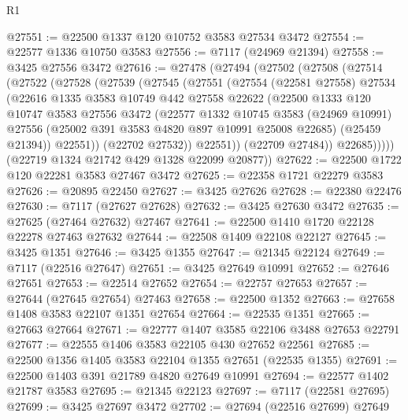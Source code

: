 \begin{lexlean}{R1}
\begin{coremodule}
@27551 := @22500 @1337 @120 @10752 @3583 @27534 @3472
@27554 := @22577 @1336 @10750 @3583
@27556 := @7117 (@24969 @21394)
@27558 := @3425 @27556 @3472
@27616 := @27478
    (@27494
      (@27502
        (@27508
          (@27514
            (@27522
              (@27528
                (@27539
                  (@27545
                    (@27551
                      (@27554
                        (@22581 @27558)
                        @27534
                        (@22616
                          @1335
                          @3583
                          @10749
                          @442
                          @27558
                          @22622
                          (@22500
                            @1333
                            @120
                            @10747
                            @3583
                            @27556
                            @3472
                            (@22577
                              @1332
                              @10745
                              @3583
                              (@24969 @10991)
                              @27556
                              (@25002 @391 @3583 @4820 @897 @10991 @25008 @22685)
                              (@25459 @21394))
                            @22551))
                        (@22702 @27532))
                      @22551))
                  (@22709 @27484))
                @22685)))))
      (@22719 @1324 @21742 @429 @1328 @22099 @20877))
@27622 := @22500 @1722 @120 @22281 @3583 @27467 @3472
@27625 := @22358 @1721 @22279 @3583
@27626 := @20895 @22450
@27627 := @3425 @27626
@27628 := @22380 @22476
@27630 := @7117 (@27627 @27628)
@27632 := @3425 @27630 @3472
@27635 := @27625 (@27464 @27632) @27467
@27641 := @22500 @1410 @1720 @22128 @22278 @27463 @27632
@27644 := @22508 @1409 @22108 @22127
@27645 := @3425 @1351
@27646 := @3425 @1355
@27647 := @21345 @22124
@27649 := @7117 (@22516 @27647)
@27651 := @3425 @27649 @10991
@27652 := @27646 @27651
@27653 := @22514 @27652
@27654 := @22757 @27653
@27657 := @27644 (@27645 @27654) @27463
@27658 := @22500 @1352
@27663 := @27658 @1408 @3583 @22107 @1351 @27654
@27664 := @22535 @1351
@27665 := @27663 @27664
@27671 := @22777 @1407 @3585 @22106 @3488 @27653 @22791
@27677 := @22555 @1406 @3583 @22105 @430 @27652 @22561
@27685 := @22500 @1356 @1405 @3583 @22104 @1355 @27651 (@22535 @1355)
@27691 := @22500 @1403 @391 @21789 @4820 @27649 @10991
@27694 := @22577 @1402 @21787 @3583
@27695 := @21345 @22123
@27697 := @7117 (@22581 @27695)
@27699 := @3425 @27697 @3472
@27702 := @27694 (@22516 @27699) @27649

\end{coremodule}
\end{lexlean}
